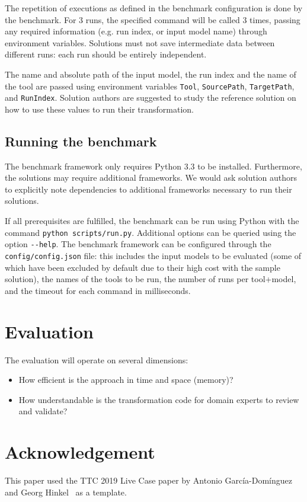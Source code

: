 \documentclass[
twocolumn,
]{ceurart}
\newcommand*{\file}[1]{\texttt{#1}}
\begin{document}
The repetition of executions as defined in the benchmark configuration is done
by the benchmark. For 3 runs, the specified command will be called 3 times,
passing any required information (e.g. run index, or input model name) through
environment variables. Solutions must not save intermediate data between
different runs: each run should be entirely independent.

The name and absolute path of the input model, the run index and the name of the
tool are passed using environment variables \file{Tool}, \file{SourcePath},
\file{TargetPath}, and \file{RunIndex}.
Solution authors are suggested to study the reference solution on how to use
these values to run their transformation.

\subsection{Running the benchmark}
\label{sec:running-benchmark}

The benchmark framework only requires Python 3.3 to be installed. Furthermore,
the solutions may require additional frameworks. We would ask solution authors to
explicitly note dependencies to additional frameworks necessary to run their
solutions.

If all prerequisites are fulfilled, the benchmark can be run using Python with
the command \file{python scripts/run.py}. Additional options can be queried
using the option \file{{-}{-}help}. The benchmark framework can be configured
through the \file{config/config.json} file: this includes the input models to be
evaluated (some of which have been excluded by default due to their high cost
with the sample solution), the names of the tools to be run, the number of runs
per tool+model, and the timeout for each command in milliseconds.

\section{Evaluation}
\label{sec:evaluation}

The evaluation will operate on several dimensions:

\begin{itemize}
\item How efficient is the approach in time and space (memory)?

\item How understandable is the transformation code for domain experts to review and validate?
\end{itemize}

\section*{Acknowledgement}

This paper used the TTC 2019 Live Case paper by Antonio García-Domínguez and
Georg Hinkel~\cite{garcia_dominguez_ttc_2019} as a template.



\end{document}
